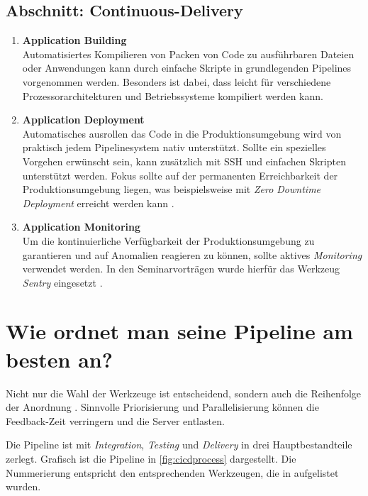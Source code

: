\subsection{Abschnitt: Continuous-Delivery}
\begin{enumerate}[resume]
    \itemsep-0.5em 
    \item \textbf{Application Building}\label{Application Building} \\
        Automatisiertes Kompilieren von Packen von Code zu ausführbaren Dateien oder Anwendungen kann durch einfache Skripte in grundlegenden Pipelines vorgenommen werden. Besonders ist dabei, dass leicht für verschiedene Prozessorarchitekturen und Betriebssysteme kompiliert werden kann.
    \item \textbf{Application Deployment}\label{Application Deployment} \\
        Automatisches ausrollen das Code in die Produktionsumgebung wird von praktisch jedem Pipelinesystem nativ unterstützt. Sollte ein spezielles Vorgehen erwünscht sein, kann zusätzlich mit SSH und einfachen Skripten unterstützt werden. Fokus sollte auf der permanenten Erreichbarkeit der Produktionsumgebung liegen, was beispielsweise mit \emph{Zero Downtime Deployment} erreicht werden kann \cite{craftquestWhatAreZero}. 
    \item \textbf{Application Monitoring}\label{Application Monitoring} \\
        Um die kontinuierliche Verfügbarkeit der Produktionsumgebung zu garantieren und auf Anomalien reagieren zu können, sollte aktives \emph{Monitoring} verwendet werden. In den Seminarvorträgen wurde hierfür das Werkzeug \emph{Sentry} eingesetzt \cite{sentryApplicationMonitoringError}.
\end{enumerate}

\section{Wie ordnet man seine Pipeline am besten an?}

Nicht nur die Wahl der Werkzeuge ist entscheidend, sondern auch die Reihenfolge der Anordnung \cite{nemytchenkoGitLabCIRun2016}. 
Sinnvolle Priorisierung und Parallelisierung können die Feedback-Zeit verringern und die Server entlasten. 

Die Pipeline ist mit \emph{Integration}, \emph{Testing} und \emph{Delivery} in drei Hauptbestandteile zerlegt. Grafisch ist die Pipeline in \autoref{fig:cicdprocess} dargestellt. Die Nummerierung entspricht den entsprechenden Werkzeugen, die in  aufgelistet wurden.

